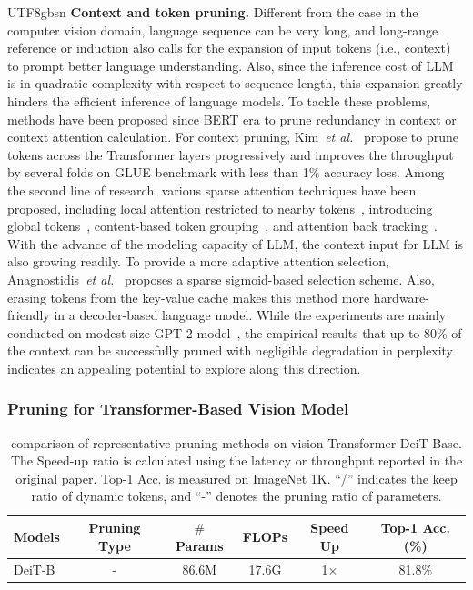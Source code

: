 \documentclass[10pt,journal,compsoc]{IEEEtran}
\newcommand{\etal}{\emph{et al.}}
\newcommand{\<}{\left\langle}
\renewcommand{\>}{\right\rangle}
\newcommand{\1}{\mathbbm{1}}
\begin{document}
\begin{CJK}{UTF8}{gbsn}
\textbf{Context and token pruning.} Different from the case in the computer vision domain, language sequence can be very long, and long-range reference or induction also calls for the expansion of input tokens (i.e., context) to prompt better language understanding. Also, since the inference cost of LLM is in quadratic complexity with respect to sequence length, this expansion greatly hinders the efficient inference of language models. To tackle these problems, methods have been proposed since BERT era to prune redundancy in context or context attention calculation. For context pruning, Kim~\etal~\cite{Kim2021LearnedTP} propose to prune tokens across the Transformer layers progressively and improves the throughput by several folds on GLUE benchmark with less than 1\% accuracy loss. Among the second line of research, various sparse attention techniques have been proposed, including local attention restricted to nearby tokens~\cite{Child2019GeneratingLS,Zaheer2020BigBT,Roy2020EfficientCS}, introducing global tokens~\cite{Guo2019StarTransformer,Zaheer2020BigBT}, content-based token grouping~\cite{kitaev2020reformer,Roy2020EfficientCS}, and attention back tracking~\cite{Lee2023SparseTT}. With the advance of the modeling capacity of LLM, the context input for LLM is also growing readily. To provide a more adaptive attention selection, Anagnostidis~\etal~\cite{Anagnostidis2023DynamicCP} proposes a sparse sigmoid-based selection scheme. Also, erasing tokens from the key-value cache makes this method more hardware-friendly in a decoder-based language model. While the experiments are mainly conducted on modest size GPT-2 model~\cite{Radford2019LanguageMA}, the empirical results that up to 80\% of the context can be successfully pruned with negligible degradation in perplexity indicates an appealing potential to explore along this direction.     

\subsubsection{Pruning for Transformer-Based Vision Model} 

\begin{table}[t]
	\centering
	\small
	\renewcommand\arraystretch{1.0}
	\setlength{\tabcolsep}{6pt}
	\caption{\small{comparison of representative pruning methods on vision Transformer DeiT-Base. The Speed-up ratio is calculated using the latency or throughput reported in the original paper. Top-1 Acc. is measured on ImageNet 1K. ``/'' indicates the keep ratio of dynamic tokens, and ``-'' denotes the pruning ratio of parameters.}}
	\vspace{-0.5em}
	\begin{tabular}{l|c|c|c|c|c}
		\Xhline{1pt}
		Models & Pruning Type &  $\#$ Params & FLOPs & Speed Up & Top-1 Acc. (\%) \\		
		\hline
		DeiT-B	& - & 86.6M	& 17.6G	& 1$\times$	& 81.8\% \\
		

\end{tabular}
\end{table}
\end{CJK}
\end{document}
